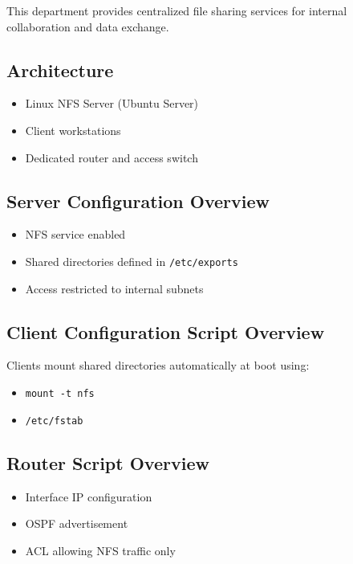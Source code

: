 \documentclass[12pt,a4paper]{article}
\begin{document}
This department provides centralized file sharing services
for internal collaboration and data exchange.

\subsection{Architecture}

\begin{itemize}
  \item Linux NFS Server (Ubuntu Server)
  \item Client workstations
  \item Dedicated router and access switch
\end{itemize}

\subsection{Server Configuration Overview}

\begin{itemize}
  \item NFS service enabled
  \item Shared directories defined in \texttt{/etc/exports}
  \item Access restricted to internal subnets
\end{itemize}

\subsection{Client Configuration Script Overview}

Clients mount shared directories automatically at boot using:
\begin{itemize}
  \item \texttt{mount -t nfs}
  \item \texttt{/etc/fstab}
\end{itemize}

\subsection{Router Script Overview}

\begin{itemize}
  \item Interface IP configuration
  \item OSPF advertisement
  \item ACL allowing NFS traffic only
\end{itemize}
\end{document}
